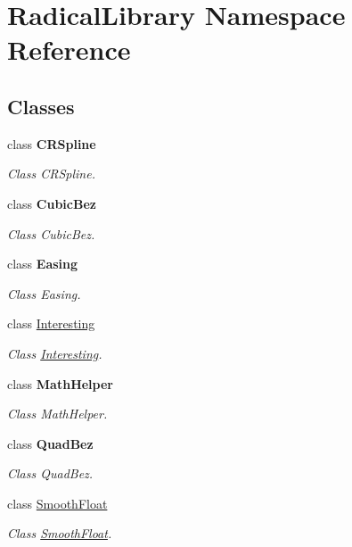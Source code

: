 \hypertarget{namespace_radical_library}{}\section{Radical\+Library Namespace Reference}
\label{namespace_radical_library}
\subsection*{Classes}
\begin{DoxyCompactItemize}
\item 
class {\bfseries C\+R\+Spline}
\begin{DoxyCompactList}\small\item\em Class C\+R\+Spline. \end{DoxyCompactList}\item 
class {\bfseries Cubic\+Bez}
\begin{DoxyCompactList}\small\item\em Class Cubic\+Bez. \end{DoxyCompactList}\item 
class {\bfseries Easing}
\begin{DoxyCompactList}\small\item\em Class Easing. \end{DoxyCompactList}\item 
class \hyperlink{class_radical_library_1_1_interesting}{Interesting}
\begin{DoxyCompactList}\small\item\em Class \hyperlink{class_radical_library_1_1_interesting}{Interesting}. \end{DoxyCompactList}\item 
class {\bfseries Math\+Helper}
\begin{DoxyCompactList}\small\item\em Class Math\+Helper. \end{DoxyCompactList}\item 
class {\bfseries Quad\+Bez}
\begin{DoxyCompactList}\small\item\em Class Quad\+Bez. \end{DoxyCompactList}\item 
class \hyperlink{class_radical_library_1_1_smooth_float}{Smooth\+Float}
\begin{DoxyCompactList}\small\item\em Class \hyperlink{class_radical_library_1_1_smooth_float}{Smooth\+Float}. \end{DoxyCompactList}\item 

\end{DoxyCompactItemize}
